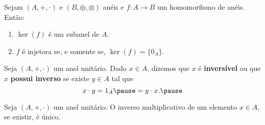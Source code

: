 \documentclass{beamer}
\begin{document}
    \begin{frame}
        \begin{proposicao}
            Sejam $(A, +, \cdot)$ e $(B, \oplus, \otimes)$ anéis \pause e $f : A \to B$ um homomorfismo de anéis. \pause Então:\pause
            \begin{enumerate}[label={\roman*})]
                \item $\ker(f)$ é um subanel de $A$.\pause

                \vspace{.5cm}

                \item $f$ é injetora \pause se, e somente se, \pause $\ker(f) = \{0_A\}$.\pause

                \vspace{.5cm}
            \end{enumerate}
        \end{proposicao}
    \end{frame}

    \begin{frame}
        \begin{definicao}
            Seja $(A, +, \cdot)$ um anel unitário. \pause Dado $x \in A$, \pause dizemos que $x$ é \textbf{inversível} \pause ou que $x$ \textbf{possui inverso} \pause se existe $y \in A$ \pause tal que\pause
            \[
                x \cdot y = 1_A \pause = y \cdot x.\pause
            \]
        \end{definicao}
    \end{frame}

    \begin{frame}
        \begin{proposicao}
            Seja $(A, +, \cdot)$ um anel unitário. \pause O inverso multiplicativo de um elemento $x \in A$, \pause se existir, \pause é único.\pause
        \end{proposicao}
    \end{frame}
\end{document}
